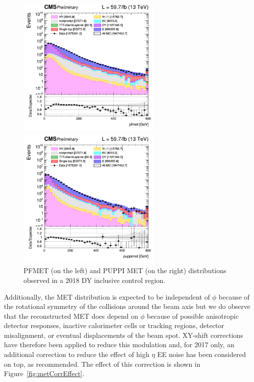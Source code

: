 \documentclass[a4paper, 10pt, openright]{report}
\begin{document}
\begin{figure}[htbp]
\centering
\begin{minipage}[b]{.49\textwidth}
\includegraphics[width=7cm, height=7cm]{figs/log_cratio_inclusiveCR_ll_pfmet_2018.png}
\end{minipage}\hfill
\begin{minipage}[b]{.49\textwidth}
\includegraphics[width=7cm, height=7cm]{figs/log_cratio_inclusiveCR_ll_puppimet_2018.png}
\end{minipage} \hfill
\caption{PFMET (on the left) and \ac{PUPPI} \ac{MET} (on the right) distributions observed in a 2018 \ac{DY} inclusive control region.}
\label{fig:metStudy}
\end{figure}

Additionally, the \ac{MET} distribution is expected to be independent of $\phi$ because of the rotational symmetry of the collisions around the beam axis but we do observe that the reconstructed \ac{MET} does depend on $\phi$ because of possible anisotropic detector responses, inactive calorimeter cells or tracking regions, detector misalignment, or eventual displacements of the beam spot. XY-shift corrections have therefore been applied to reduce this modulation and, for 2017 only, an additional correction to reduce the effect of high $\eta$ EE noise has been considered on top, as recommended. The effect of this correction is shown in Figure~\ref{fig:metCorrEffect}.
\end{document}
